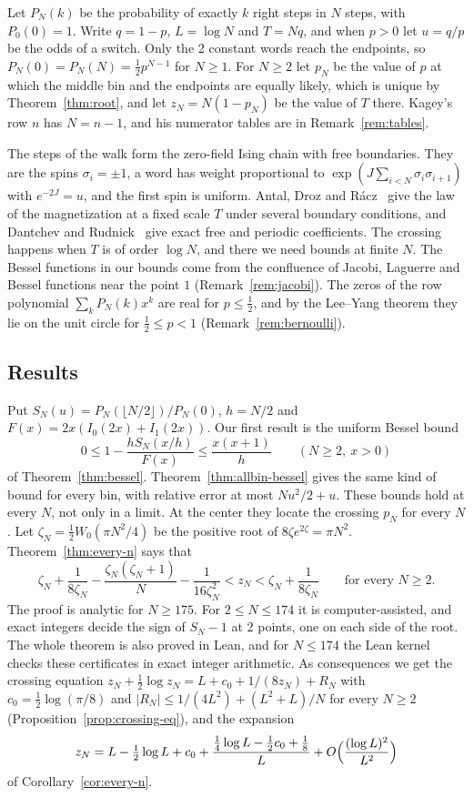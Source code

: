 \documentclass[11pt]{article}
\theoremstyle{definition}
\theoremstyle{remark}
\begin{document}
Let $P_N(k)$ be the probability of exactly $k$ right steps in $N$ steps, with
$P_0(0)=1$. Write $q=1-p$, $L=\log N$ and $T=Nq$, and when $p>0$ let $u=q/p$
be the odds of a switch. Only the 2 constant words reach the endpoints, so
$P_N(0)=P_N(N)=\frac12p^{N-1}$ for $N\ge1$. For $N\ge2$ let $p_N$ be the value
of $p$ at which the middle bin and the endpoints are equally likely, which is
unique by Theorem~\ref{thm:root}, and let $z_N=N(1-p_N)$ be the value of $T$
there. Kagey's row $n$ has $N=n-1$, and his numerator tables are in
Remark~\ref{rem:tables}.

The steps of the walk form the zero-field Ising chain with free boundaries.
They are the spins $\sigma_i=\pm1$, a word has weight proportional to
$\exp(J\sum_{i<N}\sigma_i\sigma_{i+1})$ with $e^{-2J}=u$, and the first spin
is uniform. Antal, Droz and R\'acz~\cite{antal2004} give the law of
the magnetization at a fixed scale $T$ under several boundary conditions, and
Dantchev and Rudnick~\cite{dantchev2022} give exact free and periodic
coefficients. The crossing happens when $T$ is of order $\log N$, and there we
need bounds at finite $N$. The Bessel functions in our bounds come from the
confluence of Jacobi, Laguerre and Bessel functions near the point $1$
(Remark~\ref{rem:jacobi}). The zeros of the row polynomial $\sum_kP_N(k)x^k$
are real for $p\le\frac12$, and by the Lee--Yang theorem they lie on the unit
circle for $\frac12\le p<1$ (Remark~\ref{rem:bernoulli}).

\subsection{Results}

Put $S_N(u)=P_N(\lfloor N/2\rfloor)/P_N(0)$, $h=N/2$ and
$F(x)=2x(I_0(2x)+I_1(2x))$. Our first result is the uniform Bessel bound
\[
0\le1-\frac{hS_N(x/h)}{F(x)}\le\frac{x(x+1)}h\qquad(N\ge2,\ x>0)
\]
of Theorem~\ref{thm:bessel}. Theorem~\ref{thm:allbin-bessel} gives the same
kind of bound for every bin, with relative error at most $Nu^2/2+u$. These
bounds hold at every $N$, not only in a limit. At the center they locate the
crossing $p_N$ for every $N$. Let $\zeta_N=\frac12W_0(\pi N^2/4)$ be the positive root
of $8\zeta e^{2\zeta}=\pi N^2$. Theorem~\ref{thm:every-n} says that
\[
\zeta_N+\frac1{8\zeta_N}-\frac{\zeta_N(\zeta_N+1)}N-\frac1{16\zeta_N^2}
<z_N<\zeta_N+\frac1{8\zeta_N}\qquad\text{for every }N\ge2.
\]
The proof is analytic for $N\ge175$. For $2\le N\le174$ it is
computer-assisted, and exact integers decide the sign of $S_N-1$ at 2 points,
one on each side of the root. The whole theorem is also proved in Lean, and
for $N\le174$ the Lean kernel checks these certificates in exact integer
arithmetic. As consequences we get the crossing equation
$z_N+\frac12\log z_N=L+c_0+1/(8z_N)+R_N$ with $c_0=\frac12\log(\pi/8)$ and
$|R_N|\le1/(4L^2)+(L^2+L)/N$ for every $N\ge2$
(Proposition~\ref{prop:crossing-eq}), and the expansion
\[
z_N=L-\tfrac12\log L+c_0+\frac{\frac14\log L-\frac12c_0+\frac18}{L}
+O\Bigl(\frac{(\log L)^2}{L^2}\Bigr)
\]
of Corollary~\ref{cor:every-n}.
\end{document}
